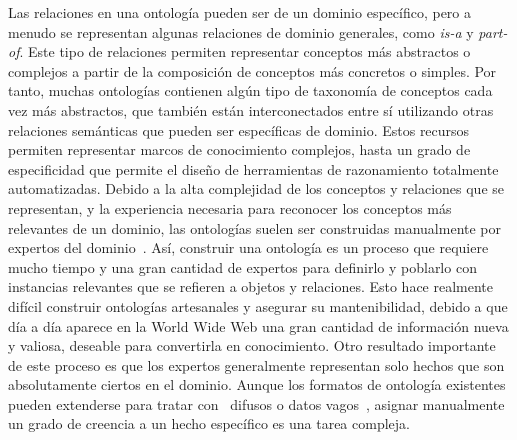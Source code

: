 Las relaciones en una ontología pueden ser de un dominio específico, pero a menudo se representan algunas relaciones de dominio generales, como \textit{is-a} y \textit{part-of}. Este tipo de relaciones permiten representar conceptos más abstractos o complejos a partir de la composición de conceptos más concretos o simples.
Por tanto, muchas ontologías contienen algún tipo de taxonomía de conceptos cada vez más abstractos, que también están interconectados entre sí utilizando otras relaciones semánticas que pueden ser específicas de dominio.
Estos recursos permiten representar marcos de conocimiento complejos, hasta un grado de especificidad que permite el diseño de herramientas de razonamiento totalmente automatizadas.
Debido a la alta complejidad de los conceptos y relaciones que se representan, y la experiencia necesaria para reconocer los conceptos más relevantes de un dominio, las ontologías suelen ser construidas manualmente por expertos del dominio~\cite{wong2012ontology}.
Así, construir una ontología es un proceso que requiere mucho tiempo y una gran cantidad de expertos para definirlo y poblarlo con instancias relevantes que se refieren a objetos y relaciones.
Esto hace realmente difícil construir ontologías artesanales y asegurar su mantenibilidad, debido a que día a día aparece en la World Wide Web una gran cantidad de información nueva y valiosa, deseable para convertirla en conocimiento.
Otro resultado importante de este proceso es que los expertos generalmente representan solo hechos que son absolutamente ciertos en el dominio. Aunque los formatos de ontología existentes pueden extenderse para tratar con~\cite{fuzzyontology} difusos o datos vagos~\cite{bobillo2011fuzzy}, asignar manualmente un grado de creencia a un hecho específico es una tarea compleja.

